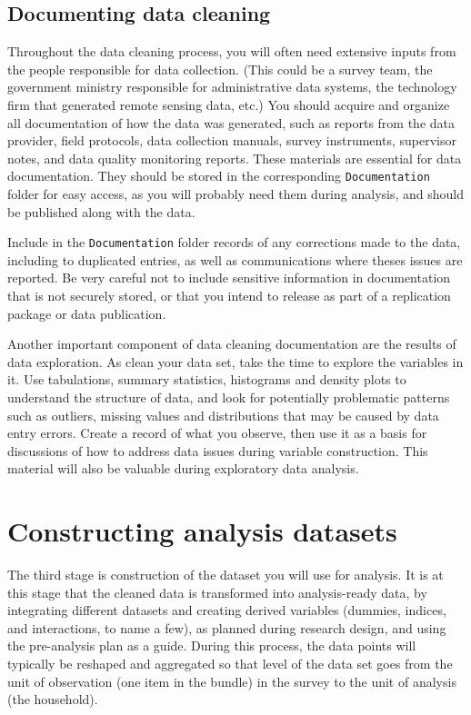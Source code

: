 \subsection{Documenting data cleaning}
Throughout the data cleaning process,
you will often need extensive inputs from the people responsible for data collection.
(This could be a survey team, the government ministry responsible for administrative data systems,
the technology firm that generated remote sensing data, etc.)
You should acquire and organize all documentation of how the data was generated, such as
reports from the data provider, field protocols, data collection manuals, survey instruments,
supervisor notes, and data quality monitoring reports.
These materials are essential for data documentation.
They should be stored in the corresponding \texttt{Documentation} folder for easy access,
as you will probably need them during analysis,
and should be published along with the data.

Include in the \texttt{Documentation} folder records of any
corrections made to the data, including to duplicated entries,
as well as communications where theses issues are reported.
Be very careful not to include sensitive information in documentation that is not securely stored,
or that you intend to release as part of a replication package or data publication.

Another important component of data cleaning documentation are the results of data exploration.
As clean your data set, take the time to explore the variables in it.
Use tabulations, summary statistics, histograms and density plots to understand the structure of data,
and look for potentially problematic patterns such as outliers,
missing values and distributions that may be caused by data entry errors.
Create a record of what you observe,
then use it as a basis for discussions of how to address data issues during variable construction.
This material will also be valuable during exploratory data analysis.

\section{Constructing analysis datasets}

The third stage is construction of the dataset you will use for analysis.
It is at this stage that the cleaned data is transformed into analysis-ready data, 
by integrating different datasets and creating derived variables 
(dummies, indices, and interactions, to name a few),
as planned during research design,
and using the pre-analysis plan as a guide.
During this process, the data points will typically be reshaped and aggregated
so that level of the data set goes from the unit of observation
(one item in the bundle) in the survey to the unit of analysis (the household).


